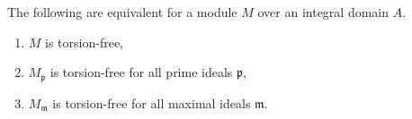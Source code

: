 The following are equivalent for a module $M$ over an integral domain $A$.

\begin{enumerate}[label=(\alph*)]
	\item $M$ is torsion-free,
	\item $M_{\mathfrak{p}}$ is torsion-free for all prime ideals $\mathfrak{p}$,
	\item $M_{\mathfrak{m}}$ is torsion-free for all maximal ideals $\mathfrak{m}$.
\end{enumerate}
